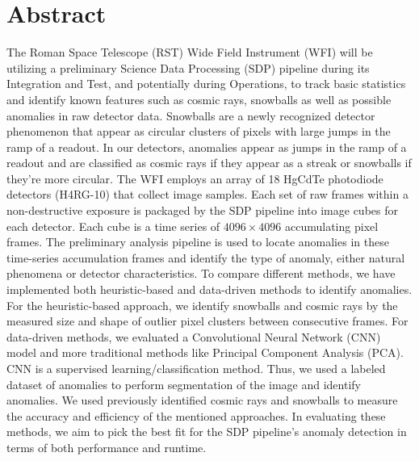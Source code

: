 \section{Abstract}
The Roman Space Telescope (RST) Wide Field Instrument (WFI) will be utilizing a preliminary Science Data Processing (SDP) pipeline during its Integration and Test, and potentially during Operations, to track basic statistics and identify known features such as cosmic rays, snowballs as well as possible anomalies in raw detector data. 
Snowballs are a newly recognized detector phenomenon that appear as circular clusters of pixels with large jumps in the ramp of a readout.
In our detectors, anomalies appear as jumps in the ramp of a readout and are classified as cosmic rays if they appear as a streak or snowballs if they're more circular. 
The WFI employs an array of 18 HgCdTe photodiode detectors (H4RG-10) that collect image samples.
Each set of raw frames within a non-destructive exposure is packaged by the SDP pipeline into image cubes for each detector.
Each cube is a time series of $4096 \times 4096$ accumulating pixel frames.
The preliminary analysis pipeline is used to locate anomalies in these time-series accumulation frames and identify the type of anomaly, either natural phenomena or detector characteristics.
To compare different methods, we have implemented both heuristic-based and data-driven methods to identify anomalies.
For the heuristic-based approach, we identify snowballs and cosmic rays by the measured size and shape of outlier pixel clusters between consecutive frames.
For data-driven methods, we evaluated a Convolutional Neural Network (CNN) model and more traditional methods like Principal Component Analysis (PCA).
CNN is a supervised learning/classification method. 
Thus, we used a labeled dataset of anomalies to perform segmentation of the image and identify anomalies. 
We used previously identified cosmic rays and snowballs to measure the accuracy and efficiency of the mentioned approaches. 
In evaluating these methods, we aim to pick the best fit for the SDP pipeline's anomaly detection in terms of both performance and runtime. 

